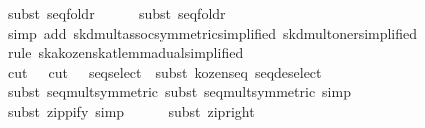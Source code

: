 \begin{isabellebody}
\ {}subst\ seq{}foldr{}\isanewline
\ \ \ \ \isamarkupfalse%
\ {}subst\ seq{}foldr{}\ \isamarkupfalse%
\ \isamarkupfalse%
\isanewline
\ \ \ \ \isamarkupfalse%
\ {}simp\ add{}\ skd{}mult{}assoc{}symmetric{}simplified{}\ skd{}mult{}oner{}simplified{}{}\isanewline
\ \ \ \ \isamarkupfalse%
\ {}rule\ ska{}kozen{}skat{}lemma{}dual{}simplified{}{}\isanewline
\ \ \ \ \isamarkupfalse%
\ {}cut\ {}\ {}{}\ cut\ {}\ {}{}\ seq{}select\ {}{}\ subst\ kozen{}{}seq{}\ seq{}deselect{}\isanewline
\ \ \ \ \isamarkupfalse%
\ {}subst\ seq{}mult{}symmetric{}{}\ subst\ seq{}mult{}symmetric{}{}\ simp{}\isanewline
\ \ \ \ \isamarkupfalse%
\ {}subst\ zippify{}\ simp{}\isanewline
\ \ \ \ \isamarkupfalse%
\ {}subst\ zip{}right{}\isanewline

\end{isabellebody}

